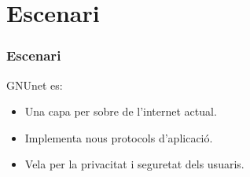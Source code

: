 \section{Escenari}

\begin{frame}
\frametitle{Escenari}
GNUnet es:

\begin{itemize}
  \item<1-> Una capa per sobre de l'internet actual.
  \item<2-> Implementa nous protocols d'aplicació.
  \item<3-> Vela per la privacitat i seguretat dels usuaris.
\end{itemize}
\end{frame}
